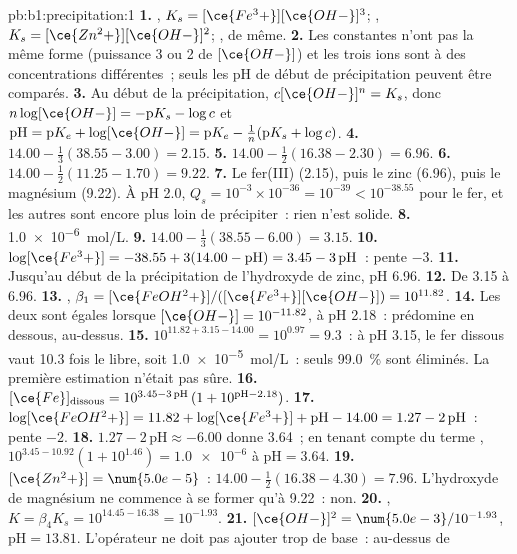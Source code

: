 \begin{solution}{pb:b1:precipitation:1}
\textbf{1.} , $K_s = [\ce{Fe^3+}][\ce{OH-}]^3$;
, $K_s = [\ce{Zn^2+}][\ce{OH-}]^2$;
, de même.
\textbf{2.} Les constantes n'ont pas la même forme (puissance 3 ou 2 de
$[\ce{OH-}]$) et les trois ions sont à des concentrations différentes~;
seuls les pH de début de précipitation peuvent être comparés.
\textbf{3.} Au début de la précipitation, $c[\ce{OH-}]^n = K_s$, donc
$n\log[\ce{OH-}] =
-\mathrm{p}K_s - \log c$ et $\mathrm{pH} = \mathrm{p}K_e +
\log[\ce{OH-}] = \mathrm{p}K_e - \frac1n(\mathrm{p}K_s + \log c)$.
\textbf{4.} $14.00 - \frac13(38.55 - 3.00) = 2.15$.
\textbf{5.} $14.00 - \frac12(16.38 - 2.30) = 6.96$.
\textbf{6.} $14.00 - \frac12(11.25 - 1.70) = 9.22$.
\textbf{7.} Le fer(III) (2.15), puis le zinc (6.96), puis le magnésium
(9.22). À pH 2.0, $Q_s = 10^{-3} \times 10^{-36} = 10^{-39} < 10^{-38.55}$
pour le fer, et les autres sont encore plus loin de précipiter~: rien
n'est solide.
\textbf{8.} \qty{1.0e-6}{mol/L}.
\textbf{9.} $14.00 - \frac13(38.55 - 6.00) = 3.15$.
\textbf{10.} $\log[\ce{Fe^3+}] = -38.55 + 3(14.00 - \mathrm{pH}) = 3.45 -
3\,\mathrm{pH}$~: pente $-3$.
\textbf{11.} Jusqu'au début de la précipitation de l'hydroxyde de zinc,
pH 6.96.
\textbf{12.} De 3.15 à 6.96.
\textbf{13.} , $\beta_1 =
[\ce{FeOH^2+}]/([\ce{Fe^3+}][\ce{OH-}]) = 10^{11.82}$.
\textbf{14.} Les deux sont égales lorsque $[\ce{OH-}] = 10^{-11.82}$, à
pH 2.18~:  prédomine en dessous,  au-dessus.
\textbf{15.} $10^{11.82 + 3.15 - 14.00} = 10^{0.97} = 9.3$~: à pH 3.15, le
fer dissous vaut 10.3 fois le  libre, soit
\qty{1.0e-5}{mol/L}~: seuls \qty{99.0}{\percent} sont éliminés. La
première estimation n'était pas sûre.
\textbf{16.} $[\ce{Fe}]_{\mathrm{dissous}} = 10^{3.45 - 3\,\mathrm{pH}}\,
(1 + 10^{\mathrm{pH} - 2.18})$.
\textbf{17.} $\log[\ce{FeOH^2+}] = 11.82 + \log[\ce{Fe^3+}] + \mathrm{pH} -
14.00 = 1.27 - 2\,\mathrm{pH}$~: pente $-2$.
\textbf{18.} $1.27 - 2\,\mathrm{pH} \approx -6.00$ donne 3.64~; en
tenant compte du terme ,
$10^{3.45 - 10.92}(1 + 10^{1.46}) =
\num{1.0e-6}$ à $\mathrm{pH} = 3.64$.
\textbf{19.} $[\ce{Zn^2+}] = \num{5.0e-5}$~: $14.00 - \frac12(16.38 - 4.30) =
7.96$. L'hydroxyde de magnésium ne commence à se former qu'à 9.22~: non.
\textbf{20.} , $K = \beta_4 K_s =
10^{14.45 - 16.38} = 10^{-1.93}$.
\textbf{21.} $[\ce{OH-}]^2 = \num{5.0e-3}/10^{-1.93}$, $\mathrm{pH} =
13.81$. L'opérateur ne doit pas ajouter trop de base~: au-dessus de

\end{solution}
